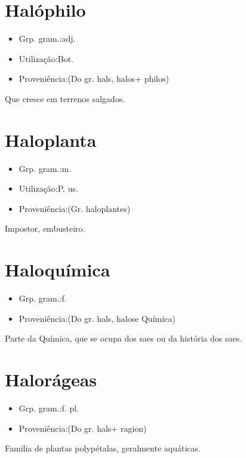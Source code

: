 \documentclass{article}
\begin{document}
\section{Halóphilo}
\begin{itemize}
\item {Grp. gram.:adj.}
\end{itemize}
\begin{itemize}
\item {Utilização:Bot.}
\end{itemize}
\begin{itemize}
\item {Proveniência:(Do gr. \textunderscore hals\textunderscore , \textunderscore halos\textunderscore  + \textunderscore philos\textunderscore )}
\end{itemize}
Que cresce em terrenos salgados.
\section{Haloplanta}
\begin{itemize}
\item {Grp. gram.:m.}
\end{itemize}
\begin{itemize}
\item {Utilização:P. us.}
\end{itemize}
\begin{itemize}
\item {Proveniência:(Gr. \textunderscore haloplantes\textunderscore )}
\end{itemize}
Impostor, embusteiro.
\section{Haloquímica}
\begin{itemize}
\item {Grp. gram.:f.}
\end{itemize}
\begin{itemize}
\item {Proveniência:(Do gr. \textunderscore hals\textunderscore , \textunderscore halos\textunderscore  e \textunderscore Química\textunderscore )}
\end{itemize}
Parte da Química, que se ocupa dos saes ou da história dos saes.
\section{Halorágeas}
\begin{itemize}
\item {Grp. gram.:f. pl.}
\end{itemize}
\begin{itemize}
\item {Proveniência:(Do gr. \textunderscore hals\textunderscore  + \textunderscore ragion\textunderscore )}
\end{itemize}
Familia de plantas polypétalas, geralmente aquáticas.
\end{document}
